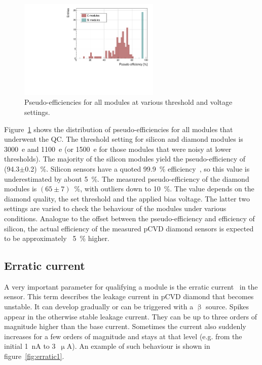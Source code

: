 \begin{figure}[!t]
\centering
\includegraphics[width=0.6\textwidth]{../scripts/04_charge_monitoring/plots/pseudoefficiency1} 
\caption{Pseudo-efficiencies for all modules at various threshold and voltage settings.}
\label{fig:pseudoeff}
\end{figure}

Figure~\ref{fig:pseudoeff} shows the distribution of pseudo-efficiencies for all modules that underwent the QC. The threshold setting for silicon and diamond modules is 3000~e and 1100~e (or 1500~e for those modules that were noisy at lower thresholds). The majority of the silicon modules yield the pseudo-efficiency of (94.3$\pm$0.2)~\%. Silicon sensors have a quoted 99.9~\% efficiency~\cite{ATLIBL:00001}, so this value is underestimated by about 5~\%. The measured pseudo-efficiency of the diamond modules is $(65\pm7)$~\%, with outliers down to 10~\%. The value depends on the diamond quality, the set threshold and the applied bias voltage. The latter two settings are varied to check the behaviour of the modules under various conditions. Analogue to the offset between the pseudo-efficiency and efficiency of silicon, the actual efficiency of the measured pCVD diamond sensors is expected to be approximately ~5~\% higher.

\subsection{Erratic current}
A very important parameter for qualifying a module is the erratic current~\cite{Mueller:1175553} in the sensor. This term describes the leakage current in pCVD diamond that becomes unstable. It can develop gradually or can be triggered with a $\upbeta$ source. Spikes appear in the otherwise stable leakage current. They can be up to three orders of magnitude higher than the base current. Sometimes the current also suddenly increases for a few orders of magnitude and stays at that level (e.g. from the initial 1~nA to 3~$\upmu$A). An example of such behaviour is shown in figure~\ref{fig:erratic1}. 

